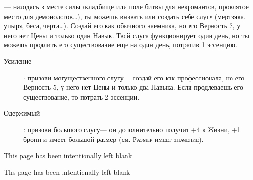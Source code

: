 \documentclass[10pt,twoside]{report}
\begin{document}
\begin{description}[noitemsep]
\item[Призыв слуги]--- находясь в месте силы (кладбище или поле битвы
  для некромантов, проклятое место для демонологов\ldots), ты можешь
  вызвать или создать себе слугу (мертвяка, упыря, беса, черта\ldots). Создай его как обычного наемника, но его Верность 3, у него
  нет Цены и только один Навык. Твой слуга функционирует один день, но
  ты можешь продлить его существование еще на один день, потратив 1
  эссенцию.
  \begin{description}
    \item[Усиление]: призови могущественного слугу--- создай его как
      профессионала, но его Верность 5, у него нет Цены и только два
      Навыка. Если продлеваешь его существование, то потрать 2
      эссенции.
      \item[Одержимый]: призови большого слугу--- он дополнительно
        получит +4 к Жизни, +1 брони и имеет большой размер
        (см. {\scshape Размер имеет значение}).
\end{description}
\end{description}
\vfill

\pagebreak

This page has been intentionally left blank

\pagebreak

Ths page has been intentionally left blank
\end{document}
